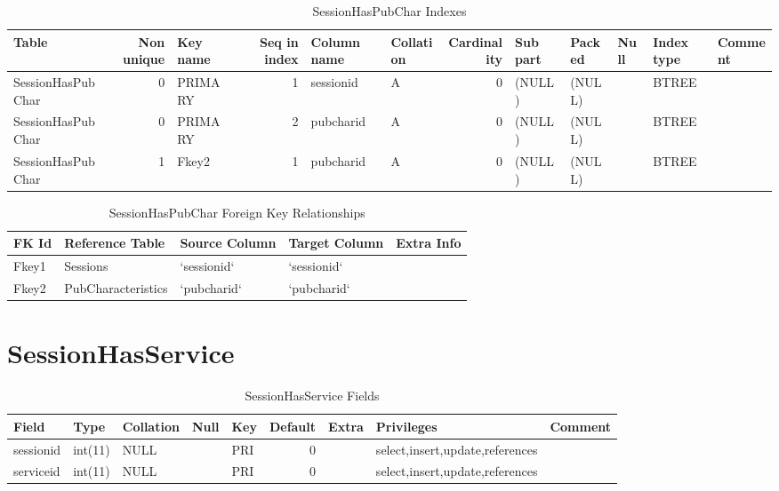 \documentclass[captions=tablesignature]{scrartcl}
\begin{document}
\begin{table}[htb]
\caption{\label{tbl:sessionhaspubcharindexes}SessionHasPubChar Indexes}
\centering
\begin{tabular}{lrlrllrlllll}
\hline
Table & Non unique & Key name & Seq in index & Column name & Collation & Cardinality & Sub part & Packed & Null & Index type & Comment\\
\hline
SessionHasPubChar & 0 & PRIMARY & 1 & sessionid & A & 0 & (NULL) & (NULL) &  & BTREE & \\
SessionHasPubChar & 0 & PRIMARY & 2 & pubcharid & A & 0 & (NULL) & (NULL) &  & BTREE & \\
SessionHasPubChar & 1 & Fkey2 & 1 & pubcharid & A & 0 & (NULL) & (NULL) &  & BTREE & \\
\hline
\end{tabular}
\end{table}

\begin{table}[htb]
\caption{\label{tbl:sessionhaspubcharfkr}SessionHasPubChar Foreign Key Relationships}
\centering
\begin{tabular}{lllll}
\hline
FK Id & Reference Table & Source Column & Target Column & Extra Info\\
\hline
Fkey1 & Sessions & `sessionid` & `sessionid` & \\
Fkey2 & PubCharacteristics & `pubcharid` & `pubcharid` & \\
\hline
\end{tabular}
\end{table}
\section{SessionHasService}
\label{sec-28}

\begin{table}[htb]
\caption{\label{tbl:sessionhasservicefields}SessionHasService Fields}
\centering
\begin{tabular}{lllllrlll}
\hline
Field & Type & Collation & Null & Key & Default & Extra & Privileges & Comment\\
\hline
sessionid & int(11) & NULL &  & PRI & 0 &  & select,insert,update,references & \\
serviceid & int(11) & NULL &  & PRI & 0 &  & select,insert,update,references & \\
\hline
\end{tabular}
\end{table}
\end{document}

